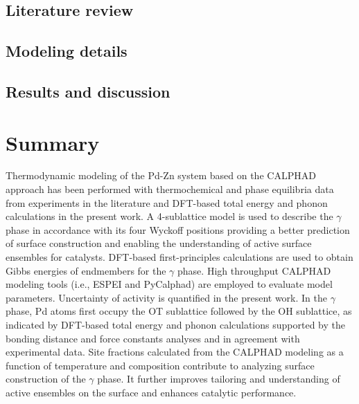 \subsection{Literature review} \label{intermetallics:ssec:PdZnMlit}


\subsection{Modeling details} \label{intermetallics:ssec:PdZnMmodel}


\subsection{Results and discussion} \label{intermetallics:ssec:PdZnMresult}


\section{Summary} \label{intermetallics:sec:Summary}
Thermodynamic modeling of the Pd-Zn system based on the CALPHAD approach has been performed with thermochemical and phase equilibria data from experiments in the literature and DFT-based total energy and phonon calculations in the present work. A 4-sublattice model is used to describe the $\gamma$ phase in accordance with its four Wyckoff positions providing a better prediction of surface construction and enabling the understanding of active surface ensembles for catalysts. DFT-based first-principles calculations are used to obtain Gibbs energies of endmembers for the $\gamma$ phase. High throughput CALPHAD modeling tools (i.e., ESPEI and PyCalphad) are employed to evaluate model parameters. Uncertainty of activity is quantified in the present work. In the $\gamma$ phase, Pd atoms first occupy the OT sublattice followed by the OH sublattice, as indicated by DFT-based total energy and phonon calculations supported by the bonding distance and force constants analyses and in agreement with experimental data. Site fractions calculated from the CALPHAD modeling as a function of temperature and composition contribute to analyzing surface construction of the $\gamma$ phase. It further improves tailoring and understanding of active ensembles on the surface and enhances catalytic performance.


